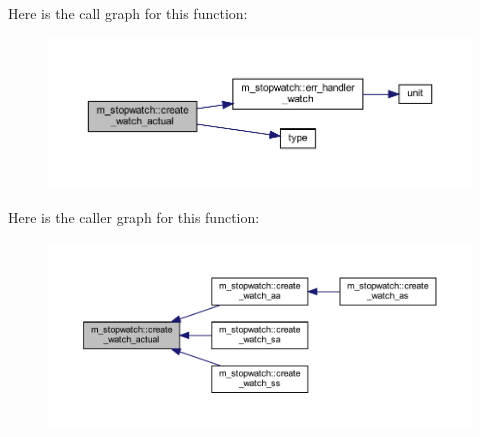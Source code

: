 Here is the call graph for this function\+:
\nopagebreak
\begin{figure}[H]
\begin{center}
\leavevmode
\includegraphics[width=350pt]{namespacem__stopwatch_aa5b637cf7ea111bd835ea3c0224ae8d6_cgraph}
\end{center}
\end{figure}
Here is the caller graph for this function\+:
\nopagebreak
\begin{figure}[H]
\begin{center}
\leavevmode
\includegraphics[width=350pt]{namespacem__stopwatch_aa5b637cf7ea111bd835ea3c0224ae8d6_icgraph}
\end{center}
\end{figure}
\mbox{\label{namespacem__stopwatch_a756111aaa293cf98f78d2bf93eb58723}} 
